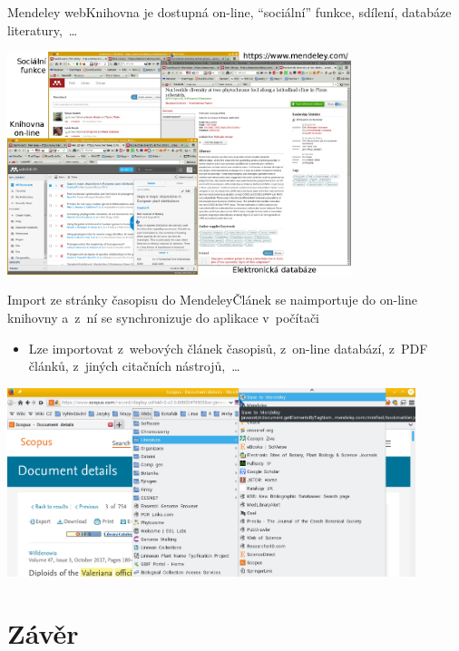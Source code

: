 \documentclass[compress, ucs, xelatex, 11pt, xcolor=svgnames, aspectratio=169,
	hyperref={
		bookmarks=true,
		unicode=true,
		colorlinks=true,
		pdftitle={Citacni software},
		plainpages=false,
		pdfauthor={Vojtech Zeisek},
		pdfsubject={Kratky uvod do citacniho software},
		pdfcreator={XeLaTeX},
		pdfkeywords={citace, reference, software, literatura},
		linkcolor=Crimson, %
		anchorcolor=Magenta, %
		citecolor=Magenta, %
		filecolor=Magenta, %
		menucolor=Magenta, %
		urlcolor=DarkTurquoise, %
		pdftex},
	url={hyphens, lowtilde} %
	]{beamer}
\begin{document}
\begin{frame}{Mendeley web}{Knihovna je dostupná on-line, \enquote{sociální} funkce, sdílení, databáze literatury,~\ldots}
	\begin{center}
		\includegraphics[height=6.5cm]{mendeley_web.png}
	\end{center}
\end{frame}

\begin{frame}{Import ze stránky časopisu do Mendeley}{Článek se naimportuje do on-line knihovny a~z~ní se synchronizuje do aplikace v~počítači}
	\begin{itemize}
		\item Lze importovat z~webových článek časopisů, z~on-line databází, z~PDF článků, z~jiných citačních nástrojů,~\ldots
	\end{itemize}
	\begin{center}
		\includegraphics[height=5.5cm]{mendeley_web_import.png}
	\end{center}
\end{frame}

\section{Závěr}
\end{document}
